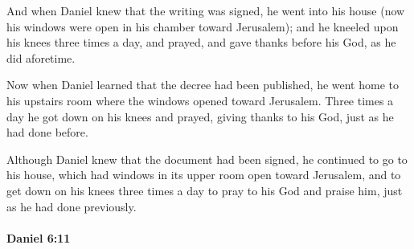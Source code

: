 			\begin{versebox}
					\item[BHS] 
					\item[LXX] 
					\item[ASV] And when Daniel knew that the writing was signed, he went into his house (now his windows were open in his chamber toward Jerusalem); and he kneeled upon his knees three times a day, and prayed, and gave thanks before his God, as he did aforetime.
					\item[NIV] Now when Daniel learned that the decree had been published, he went home to his upstairs room where the windows opened toward Jerusalem. Three times a day he got down on his knees and prayed, giving thanks to his God, just as he had done before.
					\item[NRSV] Although Daniel knew that the document had been signed, he continued to go to his house, which had windows in its upper room open toward Jerusalem, and to get down on his knees three times a day to pray to his God and praise him, just as he had done previously.
			\end{versebox}

		\paragraph{Daniel 6:11} %
			\label{DANIEL-6-11}

